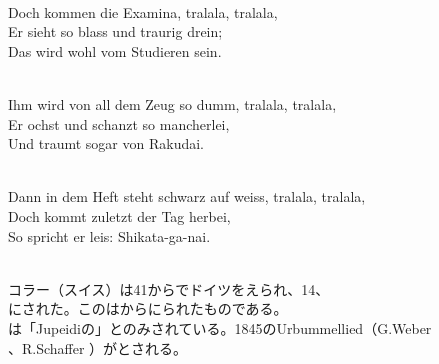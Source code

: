 \documentclass[10pt,b5j]{tarticle} %
\begin{document}
\begin{enumerate}
\begin{minipage}[c]{\blocksize}
        \vspace{\linespace}
        \item~\\
        Doch kommen die Examina, tralala, tralala,\\
        Er sieht so blass und traurig drein;\\
        Das wird wohl vom Studieren sein.
        
        \vspace{\linespace}
        \item~\\
        Ihm wird von all dem Zeug so dumm, tralala, tralala,\\
        Er ochst und schanzt so mancherlei,\\
        Und traumt sogar von Rakudai.
        
        \vspace{\linespace}
        \item~\\
        Dann in dem Heft steht schwarz auf weiss, tralala, tralala,\\
        Doch kommt zuletzt der Tag herbei,\\
        So spricht er leis: Shikata-ga-nai.
        
        
        \vspace{\linespace}
        \item~\\
        コラー（スイス）は41からでドイツをえられ、14、\\
        にされた。このはからにられたものである。\\
        は「Jupeidiの」とのみされている。1845のUrbummellied（G.Weber\\
        、R.Schaffer ）がとされる。
    
    \end{minipage}
\end{enumerate} %
\end{document}
